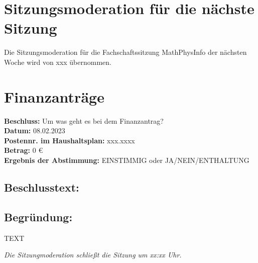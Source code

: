 \documentclass[11pt, fachschaft=mathphys,twosided=true]{mathphys-protocol}
\newcommand{\sende}{xx:xx Uhr}
\def\datum{08.02.2023}
\begin{document}
\section{Sitzungsmoderation für die nächste Sitzung}
    Die Sitzungsmoderation für die Fachschaftssitzung MathPhysInfo der nächsten Woche wird von xxx übernommen. %

\section{Finanzanträge}
\textbf{Beschluss:} Um was geht es bei dem Finanzantrag?\\
\textbf{Datum:} \datum \\
\textbf{Postennr. im Haushaltsplan:} xxx.xxxx\\
\textbf{Betrag:} 0 €\\
\textbf{Ergebnis der Abstimmung:} EINSTIMMIG oder JA/NEIN/ENTHALTUNG\\
\subsection*{Beschlusstext:}

\subsection*{Begründung:} TEXT


\emph{Die Sitzungmoderation schließt die Sitzung um \sende.}
\end{document}
